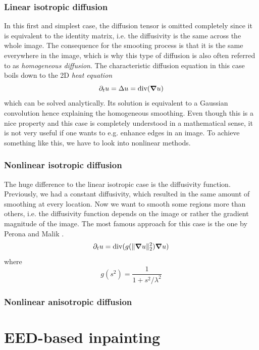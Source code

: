 \subsubsection*{Linear isotropic diffusion}
In this first and simplest case, the diffusion tensor is omitted completely since it is equivalent
to the identity matrix, i.e. the diffusivity is the same across the whole image.
The consequence for the smooting process is that it is the same everywhere in the image, which
is why this type of diffusion is also often referred to as \textit{homogeneous diffusion}.
The characteristic diffusion equation in this case boils down to the 2D \textit{heat equation}
\begin{equation}
    \partial_t u = \Delta u = \textnormal{div}(\boldsymbol\nabla u)
\end{equation}
which can be solved analytically. Its solution is equivalent to a Gaussian convolution
hence explaining the homogeneous smoothing. Even though this is a nice property and this case is
completely understood in a mathematical sense, it is not very useful if one wants to e.g. enhance
edges in an image. To achieve something like this, we have to look into nonlinear methods.

\subsubsection*{Nonlinear isotropic diffusion}
The huge difference to the linear isotropic case is the diffusivity function.
Previously, we had a constant diffusivity, which resulted in the same amount of smoothing at every location.
Now we want to smooth some regions more than others, i.e. the diffusivity function depends on the
image or rather the gradient magnitude of the image. The most famous approach for this case is the
one by Perona and Malik \cite{perona-malik}.
\begin{equation}
    \partial_t u = \textnormal{div}(g(\lVert\boldsymbol\nabla u\rVert_2^2)\boldsymbol\nabla u)
\end{equation}
where
\[g(s^2) = \frac{1}{1 + s^2/\lambda^2}\]
\subsubsection{Nonlinear anisotropic diffusion}

\section{EED-based inpainting}
